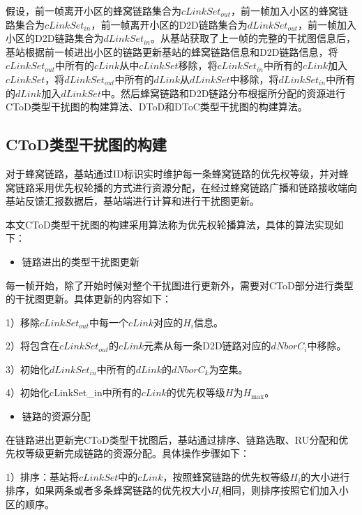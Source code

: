 \documentclass[figurelist,tablelist,algorithmlist,nomlist,masters]{seuthesix}
\begin{document}
	假设，前一帧离开小区的蜂窝链路集合为$cLinkSet_{out}$，前一帧加入小区的蜂窝链路集合为$cLinkSet_{in}$，前一帧离开小区的D2D链路集合为$dLinkSet_{out}$，前一帧加入小区的D2D链路集合为$dLinkSet_{in}$。从基站获取了上一帧的完整的干扰图信息后，基站根据前一帧进出小区的链路更新基站的蜂窝链路信息和D2D链路信息，将$cLinkSet_{out}$中所有的$cLink$从中$cLinkSet$移除，将$cLinkSet_{in}$中所有的$cLink$加入$cLinkSet$，将$dLinkSet_{out}$中所有的$dLink$从$dLinkSet$中移除，将$dLinkSet_{in}$中所有的$dLink$加入$dLinkSet$中。然后蜂窝链路和D2D链路分布根据所分配的资源进行CToD类型干扰图的构建算法、DToD和DToC类型干扰图的构建算法。
	
	

	\subsection{CToD类型干扰图的构建}

	对于蜂窝链路，基站通过ID标识实时维护每一条蜂窝链路的优先权等级，并对蜂窝链路采用优先权轮播的方式进行资源分配，在经过蜂窝链路广播和链路接收端向基站反馈汇报数据后，基站端进行计算和进行干扰图更新。
	
	本文CToD类型干扰图的构建采用算法称为优先权轮播算法，具体的算法实现如下：

	\begin{itemize}
	\item 链路进出的类型干扰图更新
	\end{itemize}

	每一帧开始，除了开始时候对整个干扰图进行更新外，需要对CToD部分进行类型的干扰图更新。具体更新的内容如下：
	
	1）移除$cLinkSet_{out}$中每一个$cLink$对应的${H_i}$信息。

	2）将包含在$cLinkSet_{out}$的$cLink$元素从每一条D2D链路对应的$dNborC_i$中移除。

	3）初始化$dLinkSet_{in}$中所有的$dLink$的$dNborC_k$为空集。

	4）初始化cLinkSet_{in}中所有的$cLink$的优先权等级${H}$为${H_{\max }}$。


	\begin{itemize}
	\item 链路的资源分配
	\end{itemize}

	在链路进出更新完CToD类型干扰图后，基站通过排序、链路选取、RU分配和优先权等级更新完成链路的资源分配。具体操作步骤如下：

	1）排序：基站将$cLinkSet$中的$cLink$，按照蜂窝链路的优先权等级${H_i}$的大小进行排序，如果两条或者多条蜂窝链路的优先权大小${H_i}$相同，则排序按照它们加入小区的顺序。
\end{document}
